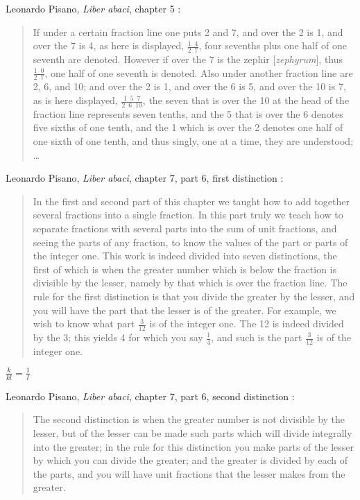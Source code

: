 \documentclass{article}
\begin{document}
Leonardo Pisano, {\em Liber abaci}, chapter 5 \cite[p.~50]{abaci}:

\begin{quote}
If under a certain fraction line one puts 2 and 7, and over the
2 is 1, and over the 7 is 4, as here is displayed, $\frac{1 \enspace 4}{2 \enspace 7}$, four sevenths plus one half
of one seventh are denoted. However if over the 7 is the zephir [{\em zephyrum}], thus $\frac{1 \enspace 0}{2 \enspace 7}$, one
half of one seventh is denoted. Also under another fraction line are 2, 6, and 10;
and over the 2 is 1, and over the 6 is 5, and over the 10 is 7, as is here displayed,
$\frac{1 \enspace 5 \enspace 7}{2 \enspace 6 \enspace 10}$,
the seven that is over the 10 at the head of the fraction line represents
seven tenths, and the 5 that is over the 6 denotes five sixths of one tenth, and
the 1 which is over the 2 denotes one half of one sixth of one tenth, and thus
singly, one at a time, they are understood; \ldots
\end{quote}

Leonardo Pisano, {\em Liber abaci}, chapter 7, part 6, first distinction \cite[p.~119]{abaci}:

\begin{quote}
In the first and second part of this chapter we taught how to add together several fractions into a single fraction.
In this part truly we teach how to
separate fractions with several parts into the sum of unit fractions, and seeing
the parts of any fraction, to know the values of the part or parts of the
integer one. This work is indeed divided into seven distinctions, the first of
which is when the greater number which is below the fraction is divisible by
the lesser, namely by that which is over the fraction line. The rule for the first
distinction is that you divide the greater by the lesser, and you will have the
part that the lesser is of the greater. For example, we wish to know what
part $\frac{3}{12}$ is of the integer one. The 12 is indeed divided by the 3; this yields 4 for
which you say $\frac{1}{4}$, and such is the part $\frac{3}{12}$ is of the integer one.
\end{quote}

$\frac{k}{kl} = \frac{1}{l}$

Leonardo Pisano, {\em Liber abaci}, chapter 7, part 6, second distinction \cite[p.~119]{abaci}:

\begin{quote}
The second distinction is when the greater number is not divisible by the
lesser, but of the lesser can be made such parts which will divide integrally into
the greater; in the rule for this distinction you make parts of the lesser by which
you can divide the greater; and the greater is divided by each of the parts, and
you will have unit fractions that the lesser makes from the greater.
\end{quote}
\end{document}
